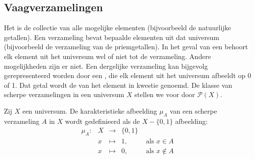 
\subsection{Vaagverzamelingen}

Het  is de collectie van alle mogelijke elementen (bijvoorbeeld de
natuurlijke getallen). Een verzameling bevat bepaalde elementen uit dat universum (bijvoorbeeld de 
verzameling van de priemgetallen). 
In het geval van een  behoort elk 
element uit het universum wel of niet tot de verzameling. Andere mogelijkheden zijn er
niet. Een dergelijke verzameling kan bijgevolg 
gerepresenteerd worden door een , die elk element uit het 
universum afbeeldt op 0 of 1. Dat getal wordt de  van het element 
in kwestie genoemd. De klasse van scherpe verzamelingen in een universum $X$ stellen we voor door 
$\mathcal{P}(X)$.
\begin{definitie}
Zij $X$ een universum. De karakteristieke afbeelding $\mu_A$ van een scherpe verzameling $A$ in $X$
wordt gedefinieerd als de $X - \{0,1\}$ afbeelding:
\begin{displaymath}
\begin{array}{lllll}
\mu_A: 	& X & \to 		& \{0,1\}	& \\
		& x & \mapsto 	& 1,		& \textrm{ als } x \in A \\
		& x & \mapsto 	& 0,		& \textrm{ als } x \notin A
\end{array}
\end{displaymath}
\end{definitie}


